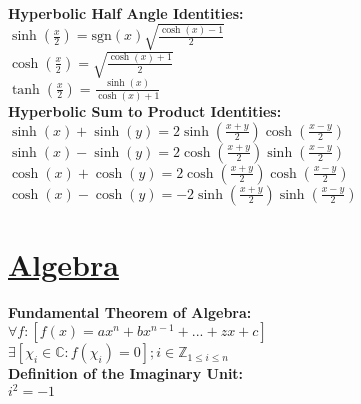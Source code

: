 \documentclass[12pt]{article}
\begin{document}
\\ \textbf{Hyperbolic Half Angle Identities:}
    \\ \( \sinh \left( \displaystyle\frac{ x }{ 2 } \right) = \text{sgn}( x ) \sqrt{ \displaystyle\frac{ \cosh( x ) - 1 }{ 2 } } \)
    \\ \( \cosh \left( \displaystyle\frac{ x }{ 2 } \right) = \sqrt{ \displaystyle\frac{ \cosh( x ) + 1 }{ 2 } } \)
    \\ \( \tanh \left( \displaystyle\frac{ x }{ 2 } \right) = \displaystyle\frac{ \sinh( x ) }{ \cosh( x ) + 1 } \)
\\ \textbf{Hyperbolic Sum to Product Identities:}
    \\ \( \sinh( x ) + \sinh( y ) = 2 \sinh \left( \displaystyle\frac{ x + y }{ 2 } \right) \cosh \left( \displaystyle\frac{ x - y }{ 2 } \right) \)
    \\ \( \sinh( x ) - \sinh( y ) = 2 \cosh \left( \displaystyle\frac{ x + y }{ 2 } \right) \sinh \left( \displaystyle\frac{ x - y }{ 2 } \right) \)
    \\ \( \cosh( x ) + \cosh( y ) = 2 \cosh \left( \displaystyle\frac{ x + y }{ 2 } \right) \cosh \left( \displaystyle\frac{ x - y }{ 2 } \right) \)
    \\ \( \cosh( x ) - \cosh( y ) = -2 \sinh \left( \displaystyle\frac{ x + y }{ 2 } \right) \sinh \left( \displaystyle\frac{ x - y }{ 2 } \right) \)



\section*{\underline{Algebra}}
\textbf{Fundamental Theorem of Algebra:}
    \\ \( \forall f : [ f( x ) = ax^n + bx^{n - 1} + ... + zx + c ] \) 
     \\ \( \exists [ \chi_i \in \mathbb{ C } : f( \chi_i ) = 0 ] ; i \in \mathbb{ Z }_{1 \le i \le n} \)
\\ \textbf{Definition of the Imaginary Unit:}
    \\ \( i^2 = -1 \)
\end{document}
